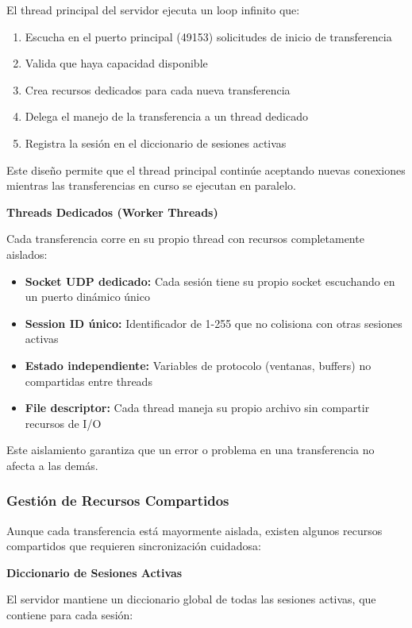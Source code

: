 El thread principal del servidor ejecuta un loop infinito que:

\begin{enumerate}
    \item Escucha en el puerto principal (49153) solicitudes de inicio de transferencia
    \item Valida que haya capacidad disponible
    \item Crea recursos dedicados para cada nueva transferencia
    \item Delega el manejo de la transferencia a un thread dedicado
    \item Registra la sesión en el diccionario de sesiones activas
\end{enumerate}

Este diseño permite que el thread principal continúe aceptando nuevas conexiones mientras las transferencias en curso se ejecutan en paralelo.

\textbf{Threads Dedicados (Worker Threads)}

Cada transferencia corre en su propio thread con recursos completamente aislados:

\begin{itemize}
    \item \textbf{Socket UDP dedicado:} Cada sesión tiene su propio socket escuchando en un puerto dinámico único
    \item \textbf{Session ID único:} Identificador de 1-255 que no colisiona con otras sesiones activas
    \item \textbf{Estado independiente:} Variables de protocolo (ventanas, buffers) no compartidas entre threads
    \item \textbf{File descriptor:} Cada thread maneja su propio archivo sin compartir recursos de I/O
\end{itemize}

Este aislamiento garantiza que un error o problema en una transferencia no afecta a las demás.

\subsubsection{Gestión de Recursos Compartidos}

Aunque cada transferencia está mayormente aislada, existen algunos recursos compartidos que requieren sincronización cuidadosa:

\textbf{Diccionario de Sesiones Activas}

El servidor mantiene un diccionario global de todas las sesiones activas, que contiene para cada sesión:


